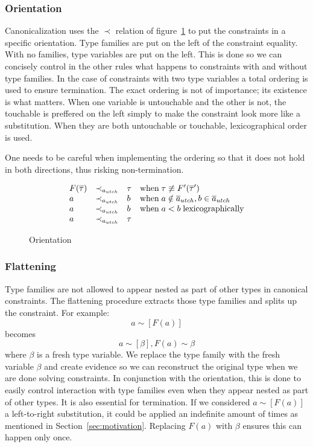 \subsubsection{Orientation}
Canonicalization uses the $\prec$ relation of figure~\ref{fig:orientation} to put the
constraints in a specific orientation. Type families are put on the left of the
constraint equality. With no families, type variables are put on the left. This
is done so we can concisely control in the other rules what happens to constraints with and without type
families. In the case of constraints with two type
variables a total ordering is used to ensure termination. The exact ordering is not of importance;
its existence is what matters.
When one variable is untouchable and the other is not, the
touchable is preffered on the left simply to make the constraint look more like
a substitution. When they are both untouchable or
touchable, lexicographical order is used.

One needs to be careful when implementing the ordering so that it does not hold
in both directions, thus risking non-termination.

\begin{figure}
\[
\begin{array}{l c l l}
F(\overline{\tau}) &\prec_{a_{utch}}& \tau &\text{when} \; \tau \not\equiv
F'(\overline{\tau}')
\\
a &\prec_{a_{utch}}& b &\text{when} \; a \notin \overline{a}_{utch}, b \in
\overline{a}_{utch}
\\
a &\prec_{a_{utch}}& b &\text{when} \; a < b \; \text{lexicographically}
\\
a &\prec_{a_{utch}}& \tau
\end{array}
\]
\caption{Orientation}
\label{fig:orientation}
\end{figure}

\subsubsection{Flattening}
Type families are not allowed to appear nested as part of other types in
canonical constraints. The flattening procedure extracts those type families and
splits up the constraint. For example: %
$$
a \sim [F(a)]
$$
becomes
$$
a \sim [\beta], F(a) \sim \beta
$$
where $\beta$ is a fresh type variable. We replace the type family with the
fresh variable $\beta$ and create evidence so we can reconstruct the original
type when we are done solving constraints. In conjunction with the orientation,
this is done to easily control interaction with type families even when they
appear nested as part of other types. It is also essential for termination. If we
considered $a \sim [F(a)]$ a left-to-right substitution, it could be applied an
indefinite amount of times as mentioned in Section~\ref{sec:motivation}.
Replacing $F(a)$ with $\beta$ ensures this can happen only once.

